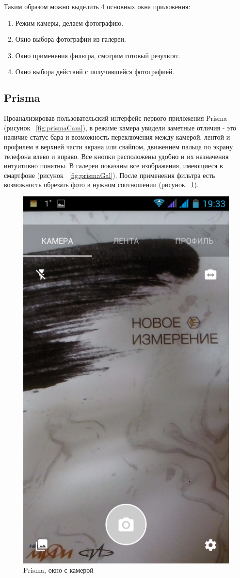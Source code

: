 Таким образом можно выделить 4 основных окна приложения:
\begin{enumerate}
	\item Режим камеры, делаем фотографию.
	\item Окно выбора фотографии из галереи.
	\item Окно применения фильтра, смотрим готовый результат.
	\item Окно выбора действий с получившейся фотографией.
\end{enumerate}

\subsection{Prisma}
Проанализировав пользовательский интерфейс первого приложения Prisma (рисунок ~\ref{fig:prismaCam}), в режиме камера увидели заметные отличия - это наличие статус бара и возможность переключения между камерой, лентой и профилем в верхней части экрана или свайпом, движением пальца по экрану телефона влево и вправо. Все кнопки расположены удобно и их назначения интуитивно понятны. В галереи показаны все изображения, имеющиеся в смартфоне (рисунок ~\ref{fig:prismaGal}). После применения фильтра есть возможность обрезать фото в нужном соотношении (рисунок ~\ref{fig:prismaProp}).

\begin{figure}[H]
	\centering
	\includegraphics[width=0.3\linewidth]{pics/prismaCam}
	\caption{Prisma, окно с камерой}
	\label{fig:prismaCam}
	\label{fig:prismaGal}
	\label{fig:prismaProp}
\end{figure}

